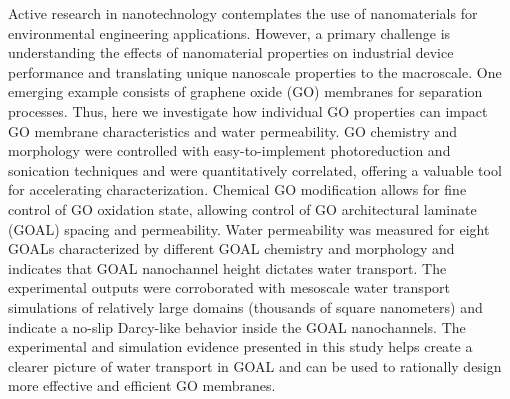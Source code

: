 Active research in nanotechnology contemplates
the use of nanomaterials for environmental engineering
applications. However, a primary challenge is understanding
the effects of nanomaterial properties on industrial device
performance and translating unique nanoscale properties to the macroscale. One emerging example consists of graphene oxide (GO) membranes for separation processes. Thus, here we investigate how individual GO properties can impact GO
membrane characteristics and water permeability. GO chemistry and morphology were controlled with easy-to-implement photoreduction and sonication techniques and were quantitatively correlated, offering a valuable tool for accelerating characterization. Chemical GO modification allows for fine control of GO oxidation state, allowing control of GO architectural laminate (GOAL) spacing and permeability. Water permeability was measured for eight GOALs characterized by different GOAL chemistry and morphology and indicates that GOAL nanochannel height dictates water transport. The experimental outputs were corroborated with mesoscale water transport simulations of relatively large domains (thousands of square nanometers) and indicate a no-slip Darcy-like behavior inside the GOAL nanochannels. The experimental and simulation evidence presented in this study helps create a clearer picture of water transport in GOAL and can be used to rationally design more effective and efficient GO membranes.